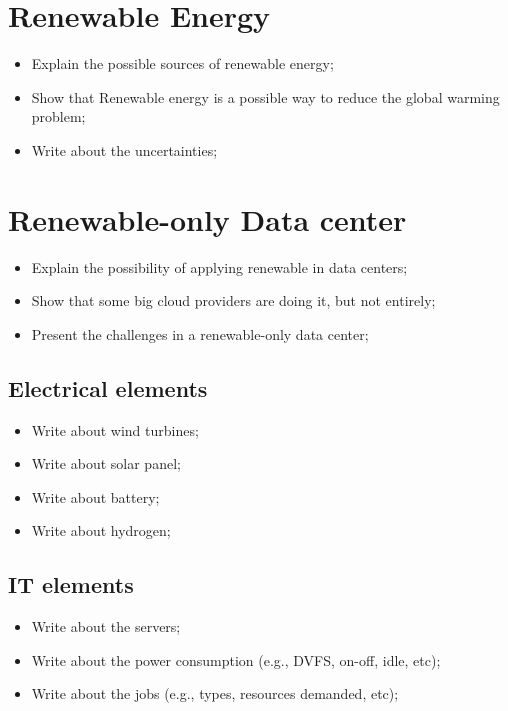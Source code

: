 \section{Renewable Energy}
\begin{itemize}
    \item Explain the possible sources of renewable energy;
    \item Show that Renewable energy is a possible way to reduce the global warming problem;
    \item Write about the uncertainties;
\end{itemize}

\section{Renewable-only Data center}
\begin{itemize}
    \item Explain the possibility of applying renewable in data centers;
    \item Show that some big cloud providers are doing it, but not entirely;
    \item Present the challenges in a renewable-only data center;
\end{itemize}

\subsection{Electrical elements}
\begin{itemize}
    \item Write about wind turbines;
    \item Write about solar panel;
    \item Write about battery;
    \item Write about hydrogen;
\end{itemize}

\subsection{IT elements}
\begin{itemize}
    \item Write about the servers;
    \item Write about the power consumption (e.g., DVFS, on-off, idle, etc);
    \item Write about the jobs (e.g., types, resources demanded, etc);
\end{itemize}

